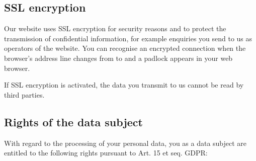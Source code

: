 \documentclass[letterpaper,10pt,english]{sphinxmanual}
\begin{document}
\subsection{SSL encryption}
\label{\detokenize{policies/legal:ssl-encryption}}
\sphinxAtStartPar
Our website uses SSL encryption for security reasons and to protect the transmission of confidential information, for example enquiries you send to us as operators of the website. You can recognise an encrypted connection when the browser’s address line changes from  to  and a padlock appears in your web browser.

\sphinxAtStartPar
If SSL encryption is activated, the data you transmit to us cannot be read by third parties.


\subsection{Rights of the data subject}
\label{\detokenize{policies/legal:rights-of-the-data-subject}}
\sphinxAtStartPar
With regard to the processing of your personal data, you as a data subject are entitled to the following rights pursuant to Art. 15 et seq. GDPR:
\end{document}
